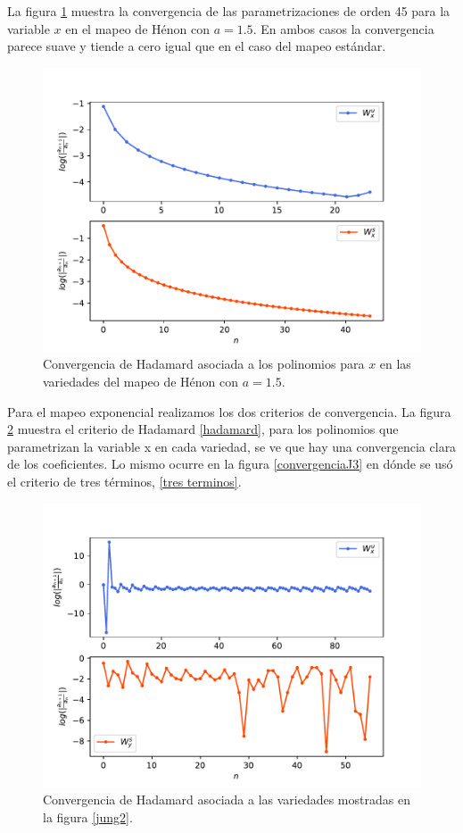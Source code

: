 La figura \ref{convergenciaHenon1} muestra la convergencia de las parametrizaciones de orden 45 para la variable $x$ en el mapeo de Hénon con $a=1.5$. En ambos casos la convergencia parece suave y tiende a cero igual que en el caso del mapeo estándar.

\begin{figure}[H]
\centering
\includegraphics[scale=0.5]{converHenon1}
\caption{Convergencia de Hadamard asociada a los polinomios para $x$ en las variedades del mapeo de Hénon con $a=1.5$.}
\label{convergenciaHenon1}
\end{figure}


Para el mapeo exponencial realizamos los dos criterios de convergencia. La figura \ref{convergenciaJH} muestra el criterio de Hadamard \eqref{hadamard}, para los polinomios que parametrizan la variable x en cada variedad, se ve que hay una convergencia clara de los coeficientes. Lo mismo ocurre en la figura \ref{convergenciaJ3} en dónde se usó el criterio de tres términos, \eqref{tres terminos}.

\begin{figure}[H]
\centering
\includegraphics[scale=0.5]{convergenciaJungH57}
\caption{Convergencia de Hadamard asociada a las variedades mostradas en la figura \ref{jung2}.}
\label{convergenciaJH}
\end{figure}


